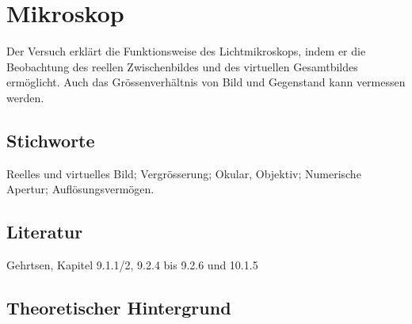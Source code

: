 \chapter{Mikroskop}
\label{v:8}

Der Versuch erklärt die Funktionsweise des Lichtmikroskops, indem er die Beobachtung des reellen Zwischenbildes und des virtuellen Gesamtbildes ermöglicht. Auch das Grössenverhältnis von Bild und Gegenstand kann vermessen werden.

\section{Stichworte}

Reelles und virtuelles Bild; Vergrösserung; Okular, Objektiv; Numerische Apertur; Auflösungsvermögen.
%
\section{Literatur}

Gehrtsen, Kapitel 9.1.1/2, 9.2.4 bis 9.2.6 und 10.1.5
%
\section{Theoretischer Hintergrund}

%

